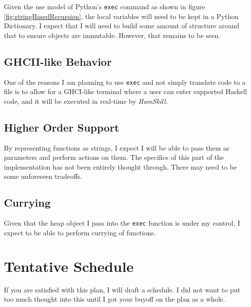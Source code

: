 \documentclass{report}
\begin{document}
Given the use model of Python's {\tt exec} command as shown in figure \ref{fig:stringBasedRecursion}, the local variables will need to be kept in a Python Dictionary.  I expect that I will need to build some amount of structure around that to ensure objects are immutable.  However, that remains to be seen.


\subsection{GHCII-like Behavior}

One of the reasons I am planning to use {\tt exec} and not simply translate code to a file is to allow for a GHCI-like terminal where a user can enter supported Haskell code, and it will be executed in real-time by \emph{HamSkill}.

\subsection{Higher Order Support}

By representing functions as strings, I expect I will be able to pass them as parameters and perform actions on them.  The specifics of this part of the implementation has not been entirely thought through.  There may need to be some unforeseen tradeoffs.

\subsection{Currying}

Given that the heap object I pass into the {\tt exec} function is under my control, I expect to be able to perform currying of functions.

\section{Tentative Schedule}

If you are satisfied with this plan, I will draft a schedule.  I did not want to put too much thought into this until I got your buyoff on the plan as a whole.

\pagebreak


\end{document}
